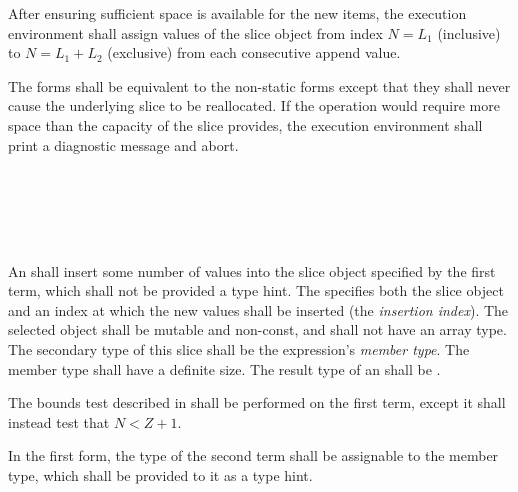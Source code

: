 \specsubsubitem
After ensuring sufficient space is available for the new items, the execution
environment shall assign values of the slice object from index $N = L_1$
(inclusive) to $N = L_1 + L_2$ (exclusive) from each consecutive append value.

\specsubsubitem
The  forms shall be equivalent to the non-static forms except
that they shall never cause the underlying slice to be reallocated. If the
operation would require more space than the capacity of the slice provides, the
execution environment shall print a diagnostic message and abort.


\begin{grammar}
 \\
	  \terminal{(}  \terminal{,}  \terminal{)} \\
	  \terminal{(}  \terminal{,}   \terminal{)} \\
	  \terminal{(}  \terminal{,}  \terminal{,}  \terminal{)} \\
\end{grammar}

\specsubsubitem
An  shall insert some number of values into the
slice object specified by the first term, which shall not be provided a type
hint. The  specifies both the slice object and
an index at which the new values shall be inserted (the \textit{insertion
index}). The selected object shall be mutable and non-const, and shall not have
an array type. The secondary type of this slice shall be the expression's
\textit{member type}. The member type shall have a definite size. The result
type of an  shall be .

\specsubsubitem
The bounds test described in  shall be performed on the
first term, except it shall instead test that $N < Z+1$.

\specsubsubitem
In the first form, the type of the second term shall be assignable to the member
type, which shall be provided to it as a type hint.

